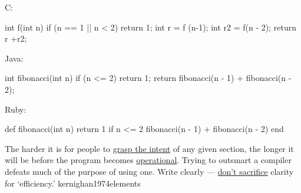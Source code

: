 \documentclass{article}
\begin{document}

\begin{pptWide}{3}
C:\par
{\small\begin{ffcode}
int f(int n)
{
  if (n == 1 || n < 2)
    return 1;
  int r = f (n-1);
  int r2 = f(n - 2);
  return r +r2;
  }
\end{ffcode}
}
\par\columnbreak\par
Java:\par
{\small\begin{ffcode}
int fibonacci(int n) {
  if (n <= 2) {
    return 1;
  }
  return fibonacci(n - 1)
    + fibonacci(n - 2);
}
\end{ffcode}
}
\par\columnbreak\par
Ruby:\par
{\small\begin{ffcode}
def fibonacci(int n)
  return 1 if n <= 2
  fibonacci(n - 1)
    + fibonacci(n - 2)
end
\end{ffcode}
}
\end{pptWide}
\plush{}

  {The harder it is for people to \ul{grasp the intent} of any given section, the longer it will be before the program becomes \ul{operational}. Trying to outsmart a compiler defeats much of the purpose of using one. Write clearly --- \ul{don't sacrifice} clarity for `efficiency.'}
  {kernighan1974elements}
\end{document}
